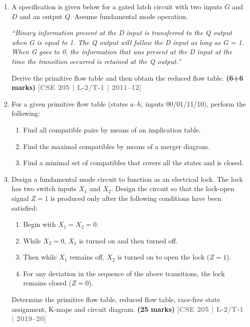 \documentclass[12pt,a4paper]{article}
\newcommand{\yr}[1]{\hfill\textcolor{gray}{\small\textbf{[#1]}}}
\newcommand{\mk}[1]{\textcolor{orange!70!black}{\small\textbf{(#1 marks)}}}
\begin{document}
\begin{enumerate}

\item A specification is given below for a gated latch circuit with two inputs $G$ and $D$ and an output $Q$. Assume fundamental mode operation.

\textit{``Binary information present at the D input is transferred to the Q output when G is equal to 1. The Q output will follow the D input as long as G = 1. When G goes to 0, the information that was present at the D input at the time the transition occurred is retained at the Q output.''}

Derive the primitive flow table and then obtain the reduced flow table.
\mk{6+6} \yr{CSE 205 | L-2/T-1 | 2011--12}


\item For a given primitive flow table (states $a$--$h$, inputs 00/01/11/10), perform the following:
\begin{enumerate}
  \item Find all compatible pairs by means of an implication table.
  \item Find the maximal compatibles by means of a merger diagram.
  \item Find a minimal set of compatibles that covers all the states and is closed.
\end{enumerate}

\item Design a fundamental mode circuit to function as an electrical lock. The lock has two switch inputs $X_1$ and $X_2$. Design the circuit so that the lock-open signal $Z=1$ is produced only after the following conditions have been satisfied:
\begin{enumerate}
  \item Begin with $X_1 = X_2 = 0$.
  \item While $X_2 = 0$, $X_1$ is turned on and then turned off.
  \item Then while $X_1$ remains off, $X_2$ is turned on to open the lock ($Z=1$).
  \item For any deviation in the sequence of the above transitions, the lock remains closed ($Z=0$).
\end{enumerate}
Determine the primitive flow table, reduced flow table, race-free state assignment, K-maps and circuit diagram.
\mk{25} \yr{CSE 205 | L-2/T-1 | 2019--20}



\end{enumerate}
\end{document}
